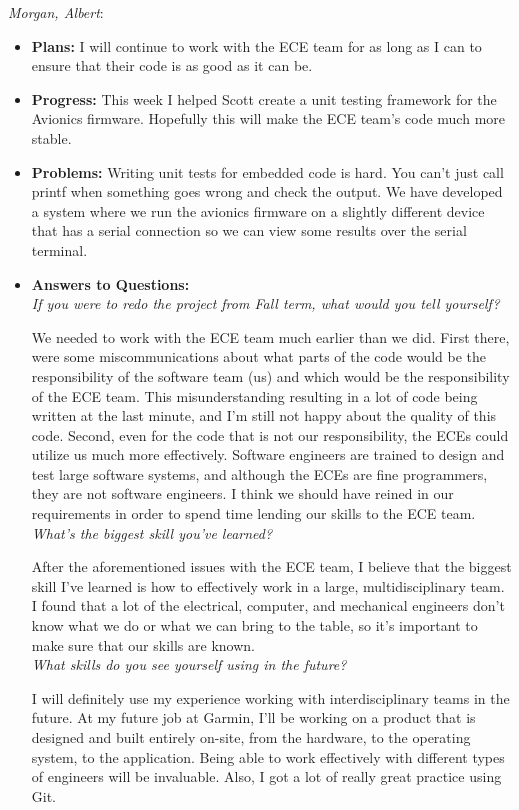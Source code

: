 \documentclass[10pt,draftclsnofoot,onecolumn]{IEEEtran}
\newcommand{\subsubsubsection}[1]{
	\hfill\break\textit{#1}:
}
\begin{document}
\subsubsubsection{Morgan, Albert}
\begin{itemize}
	\item \textbf{Plans: }
	I will continue to work with the ECE team for as long as I can to ensure that their code is as good as it can be.
	\item \textbf{Progress: }
	This week I helped Scott create a unit testing framework for the Avionics firmware. Hopefully this will make the ECE team's code much more stable.
	\item \textbf{Problems: }
	Writing unit tests for embedded code is hard. You can't just call printf when something goes wrong and check the output. We have developed a system where we run the avionics firmware on a slightly different device that has a serial connection so we can view some results over the serial terminal.
	\item\textbf{Answers to Questions: }\\
	\textit{If you were to redo the project from Fall term, what would you tell yourself?}

	We needed to work with the ECE team much earlier than we did. First there, were some miscommunications about what parts of the code would be the responsibility of the software team (us) and which would be the responsibility of the ECE team. This misunderstanding resulting in a lot of code being written at the last minute, and I'm still not happy about the quality of this code. Second, even for the code that is not our responsibility, the ECEs could utilize us much more effectively. Software engineers are trained to design and test large software systems, and although the ECEs are fine programmers, they are not software engineers. I think we should have reined in our requirements in order to spend time lending our skills to the ECE team.\\

	\textit{What's the biggest skill you've learned?}

	After the aforementioned issues with the ECE team, I believe that the biggest skill I've learned is how to effectively work in a large, multidisciplinary team. I found that a lot of the electrical, computer, and mechanical engineers don't know what we do or what we can bring to the table, so it's important to make sure that our skills are known.\\

	\textit{What skills do you see yourself using in the future?}

	I will definitely use my experience working with interdisciplinary teams in the future. At my future job at Garmin, I'll be working on a product that is designed and built entirely on-site, from the hardware, to the operating system, to the application. Being able to work effectively with different types of engineers will be invaluable. Also, I got a lot of really great practice using Git.\\


\end{itemize}
\end{document}
